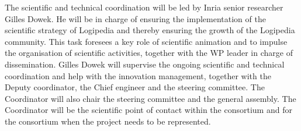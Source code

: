 \begin{workpackage}[id=management,type=MGT,wphases=1-48,
  short=Management,
  title=Management,
  lead=Inr,InrRM=50,BirRM=1,InnRM=1,SacRM=1,TumRM=1,LeeRM=1]
\begin{tasklist}
  \begin{task}[id=coordination,title=Scientific and technical coordination,lead=Inr,InrRM=12,wphases=1-48]
    The scientific and technical coordination will be led by Inria
    senior researcher Gilles Dowek. He will be in charge of ensuring
    the implementation of the scientific strategy of Logipedia and
    thereby ensuring the growth of the Logipedia community. This task
    foresees a key role of scientific animation and to impulse the
    organisation of scientific activities, together with the WP leader
    in charge of dissemination. Gilles Dowek will supervise the
    ongoing scientific and technical coordination and help with the
    innovation management, together with the Deputy coordinator, the
    Chief engineer and the steering committee. The
    Coordinator will also chair the steering committee and the general
    assembly. The Coordinator will be the scientific point of contact
    within the consortium and for the consortium when the project
    needs to be represented.
  \end{task}


\end{tasklist}
\end{workpackage}
